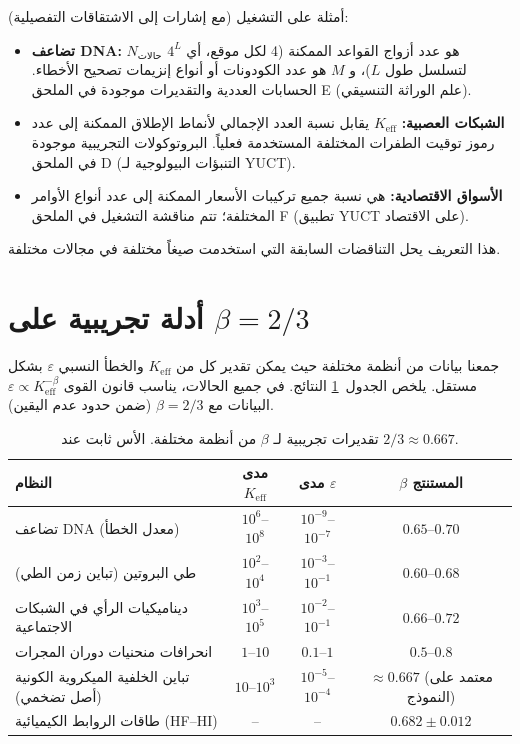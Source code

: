 \documentclass[11pt,a4paper]{article}
\newcommand{\ar}[1]{\foreignlanguage{arabic}{#1}}
\newcommand{\Keff}{K_{\mathrm{eff}}}
\newcommand{\eps}{\varepsilon}
\begin{document}
	\ar{أمثلة على التشغيل (مع إشارات إلى الاشتقاقات التفصيلية):}
	\begin{itemize}
		\item \textbf{\ar{تضاعف DNA:}} \ar{\(N_{\text{حالات}}\) هو عدد أزواج القواعد الممكنة (4 لكل موقع، أي \(4^L\) لتسلسل طول \(L\))، و \(M\) هو عدد الكودونات أو أنواع إنزيمات تصحيح الأخطاء. الحسابات العددية والتقديرات موجودة في الملحق E (علم الوراثة التنسيقي).}
		\item \textbf{\ar{الشبكات العصبية:}} \ar{\(\Keff\) يقابل نسبة العدد الإجمالي لأنماط الإطلاق الممكنة إلى عدد رموز توقيت الطفرات المختلفة المستخدمة فعلياً. البروتوكولات التجريبية موجودة في الملحق D (التنبؤات البيولوجية لـ YUCT).}
		\item \textbf{\ar{الأسواق الاقتصادية:}} \ar{هي نسبة جميع تركيبات الأسعار الممكنة إلى عدد أنواع الأوامر المختلفة؛ تتم مناقشة التشغيل في الملحق F (تطبيق YUCT على الاقتصاد).}
	\end{itemize}
	\ar{هذا التعريف يحل التناقضات السابقة التي استخدمت صيغاً مختلفة في مجالات مختلفة.}
	
	\section{\ar{أدلة تجريبية على \(\beta = 2/3\)}}
	\label{sec:evidence}
	
	\ar{جمعنا بيانات من أنظمة مختلفة حيث يمكن تقدير كل من \(\Keff\) والخطأ النسبي \(\eps\) بشكل مستقل. يلخص الجدول~\ref{tab:data} النتائج. في جميع الحالات، يناسب قانون القوى \(\eps \propto \Keff^{-\beta}\) البيانات مع \(\beta = 2/3\) (ضمن حدود عدم اليقين).}
	
	\begin{table}[htbp]
		\centering
		\caption{\ar{تقديرات تجريبية لـ \(\beta\) من أنظمة مختلفة. الأس ثابت عند \(2/3 \approx 0.667\).}}
		\label{tab:data}
		\begin{tabular}{lccc}
			\toprule
			\ar{النظام} & \ar{مدى \(\Keff\)} & \ar{مدى \(\eps\)} & \ar{\(\beta\) المستنتج} \\
			\midrule
			\ar{تضاعف DNA (معدل الخطأ)} & \(10^6\)–\(10^8\) & \(10^{-9}\)–\(10^{-7}\) & \(0.65\)–\(0.70\) \\
			\ar{طي البروتين (تباين زمن الطي)} & \(10^2\)–\(10^4\) & \(10^{-3}\)–\(10^{-1}\) & \(0.60\)–\(0.68\) \\
			\ar{ديناميكيات الرأي في الشبكات الاجتماعية} & \(10^3\)–\(10^5\) & \(10^{-2}\)–\(10^{-1}\) & \(0.66\)–\(0.72\) \\
			\ar{انحرافات منحنيات دوران المجرات} & \(1\)–\(10\) & \(0.1\)–\(1\) & \(0.5\)–\(0.8\) \\
			\ar{تباين الخلفية الميكروية الكونية (أصل تضخمي)} & \(10\)–\(10^3\) & \(10^{-5}\)–\(10^{-4}\) & \(\approx 0.667\) (\ar{معتمد على النموذج}) \\
			\ar{طاقات الروابط الكيميائية (HF–HI)} & – & – & \(0.682 \pm 0.012\) \\
			\bottomrule
		\end{tabular}
	\end{table}
	
\end{document}
